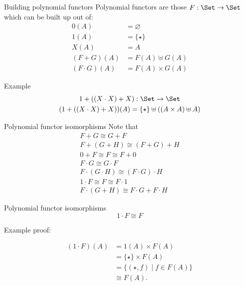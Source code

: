 \documentclass[xcolor=svgnames,12pt]{beamer}
\newenvironment{xframe}[1][]
  {\begin{frame}[fragile,environment=xframe,#1]}
  {\end{frame}}
\begin{document}
\begin{xframe}{Building polynomial functors}
  Polynomial functors are those $F : \Set \to \Set$ which can be built
  up out of:
  \begin{align*}
    0(A) &= \varnothing \\
    1(A) &= \{\star\} \\
    X(A) &= A \\
    (F + G)(A) &= F(A) \uplus G(A) \\
    (F \cdot G)(A) &= F(A) \times G(A)
  \end{align*}
\end{xframe}

\begin{xframe}{Example}
  \begin{gather*}
    1 + ((X \cdot X) + X) : \Set \to \Set \\
    (1 + ((X \cdot X) + X))(A) = \{\star\} \uplus ((A \times A) \uplus A)
  \end{gather*}
\end{xframe}

\begin{xframe}{Polynomial functor isomorphisms}
  Note that
  \begin{gather*}
    F + G \cong G + F \\
    F + (G + H) \cong (F + G) + H \\
    0 + F \cong F \cong F + 0 \\
    F \cdot G \cong G \cdot F \\
    F \cdot (G \cdot H) \cong (F \cdot G) \cdot H \\
    1 \cdot F \cong F \cong F \cdot 1 \\
    F \cdot (G + H) \cong F \cdot G + F \cdot H
  \end{gather*}
\end{xframe}

\begin{xframe}{Polynomial functor isomorphisms}
\[ 1 \cdot F \cong F \]

Example proof:

  \begin{align*}
    (1 \cdot F)(A) &= 1(A) \times F(A) \\
    &= \{\star\} \times F(A) \\
    &= \{(\star, f) \mid f \in F(A)\} \\
    &\cong F(A).
  \end{align*}
\end{xframe}
\end{document}
